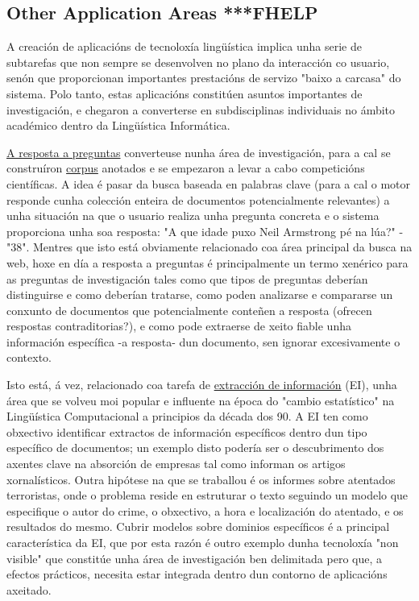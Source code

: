 \begin{multicols}{2}
\subsection{Other Application Areas ***FHELP}

   A creación de aplicacións de tecnoloxía lingüística implica unha serie de subtarefas que non sempre se desenvolven no plano da interacción co usuario, senón que proporcionan importantes prestacións de servizo "baixo a carcasa" do sistema. Polo tanto, estas aplicacións constitúen asuntos importantes de investigación, e chegaron a converterse en subdisciplinas individuais no ámbito académico dentro da Lingüística Informática. 

\uline{A resposta a preguntas} converteuse nunha área de investigación, para a cal se construíron \uline{corpus} anotados e se empezaron a levar a cabo competicións científicas. A idea é pasar da busca baseada en palabras clave (para a cal o motor responde cunha colección enteira de documentos potencialmente relevantes) a unha situación na que o usuario realiza unha pregunta concreta e o sistema proporciona unha soa resposta: "A que idade puxo Neil Armstrong pé na lúa?" - "38". Mentres que isto está obviamente relacionado coa área principal da busca na web, hoxe en día a resposta a preguntas é principalmente un termo xenérico para as preguntas de investigación tales como que tipos de preguntas deberían distinguirse e como deberían tratarse, como poden analizarse e compararse un conxunto de documentos que potencialmente conteñen a resposta (ofrecen respostas contraditorias?), e como pode extraerse de xeito fiable unha información específica -a resposta- dun documento, sen ignorar excesivamente o contexto. 

Isto está, á vez, relacionado coa tarefa de \uline{extracción de información} (EI), unha área que se volveu moi popular e influente na época do "cambio estatístico" na Lingüística Computacional a principios da década dos 90. A EI ten como obxectivo identificar extractos de información específicos dentro dun tipo específico de documentos; un exemplo disto podería ser o descubrimento dos axentes clave na absorción de empresas tal como informan os artigos xornalísticos. Outra hipótese na que se traballou é os informes sobre atentados terroristas, onde o problema reside en estruturar o texto seguindo un modelo que especifique o autor do crime, o obxectivo, a hora e localización do atentado, e os resultados do mesmo. Cubrir modelos sobre dominios específicos é a principal característica da EI, que por esta razón é outro exemplo dunha tecnoloxía "non visible" que constitúe unha área de investigación ben delimitada pero que, a efectos prácticos, necesita estar integrada dentro dun contorno de aplicacións axeitado. 


\end{multicols}
